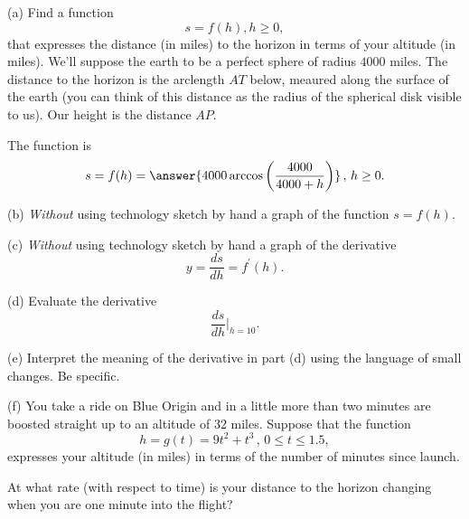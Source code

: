 \documentclass{ximera}
\begin{document}
\begin{question}  \label{Q:LLKDKFG}
(a) Find a function
\[
     s = f(h) , h\geq 0 ,
\]
that expresses the distance (in miles) to the horizon in terms of your altitude (in miles). We'll suppose the earth to be a perfect sphere of radius $4000$ miles. The distance to the horizon is the arclength $AT$ below, meaured along the surface of the earth (you can think of this distance as the radius of the spherical disk visible to us). Our height is the distance $AP$. 
 
The function is 
\[
   s = f(h) = \answer{4000 \arccos\left( \frac{4000}{4000+h} \right) } \, , \, h \geq 0 .
\]

\begin{onlineOnly}
    \begin{center}
\end{center}
\end{onlineOnly}

(b) \emph{Without} using technology sketch by hand a graph of the function $s=f(h)$.

(c) \emph{Without} using technology sketch by hand a graph of the derivative
\[
   y = \frac{ds}{dh} = f^\prime(h) .
\] 

(d) Evaluate the derivative 
\[
      \frac{ds}{dh}\Big|_{h=10} .
\]

(e) Interpret the meaning of the derivative in part (d) using the language of small changes. Be specific.

(f) You take a ride on Blue Origin and in a little more than two minutes are boosted straight up to an altitude of 32 miles. Suppose that the function
\[
      h = g(t) = 9t^2 + t^3 \, , \, 0\leq t \leq 1.5 ,
\]
expresses your altitude (in miles) in terms of the number of minutes since launch.

At what rate (with respect to time) is your distance to the horizon changing when you are one minute into the flight?
\end{question}
\end{document}
